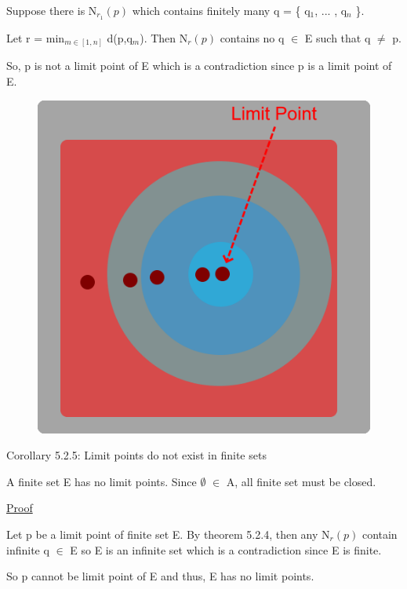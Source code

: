 	Suppose there is N$_{r_1}(p)$ which contains finitely many q = \{ q$_1$, ... , q$_n$ \}.

	Let r = min$_{m \in [1,n]}$ d(p,q$_m$). Then N$_r(p)$ contains no q $\in$ E such that q $\not =$ p.

	So, p is not a limit point of E which is a contradiction since p is a limit point of E.

\begin{figure}[h]
	\centering
	\includegraphics[scale=0.31]{Images/5.2.4.png}
\end{figure}

{ \color{orange} Corollary 5.2.5: Limit points do not exist in finite sets } 
	
	\begin{adjustbox}{minipage=14cm, right, vspace=0.1cm 0cm}
		A finite set E has no limit points.
		Since $\emptyset$ $\in$ A, all finite set must be closed.
	\end{adjustbox}

{ \color{magenta} \underline{Proof} } 

	Let p be a limit point of finite set E. By {\color{red} theorem 5.2.4}, 
	then any N$_r(p)$ contain infinite q $\in$ E so E is an infinite set
	which is a contradiction since E is finite.

	So p cannot be limit point of E and thus, E has no limit points. \\

